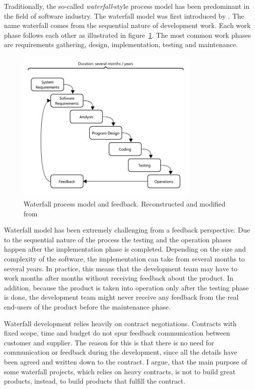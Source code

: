 \documentclass[english,12pt,a4paper,pdftex]{article}
\begin{document}
Traditionally, the so-called \emph{waterfall}-style process model has been predominant in the field of software industry. The waterfall model was first introduced by \citet{royce1970}. The name waterfall comes from the sequential nature of development work. Each work phase follows each other as illustrated in figure~\ref{fig:waterfall}. The most common work phases are requirements gathering, design, implementation, testing and maintenance.


\begin{figure}[htb]
\begin{center}
\includegraphics[width=0.8\textwidth]{waterfall_reconstructed.png}
\end{center}
\caption{Waterfall process model and feedback. Reconstructed and modified from \citet{royce1970}}
\label{fig:waterfall}
\end{figure}


Waterfall model has been extremely challenging from a feedback perspective. Due to the sequential nature of the process the testing and the operation phases happen after the implementation phase is completed. Depending on the size and complexity of the software, the implementation can take from several months to several years. In practice, this means that the development team may have to work months after months without receiving feedback about the product. In addition, because the product is taken into operation only after the testing phase is done, the development team might never receive any feedback from the real end-users of the product before the maintenance phase.

Waterfall development relies heavily on contract negotiations. Contracts with fixed scope, time and budget do not spur feedback communication between customer and supplier. The reason for this is that there is no need for communication or feedback during the development, since all the details have been agreed and written down to the contract. I argue, that the main purpose of some waterfall projects, which relies on heavy contracts, is not to build great products, instead, to build products that fulfill the contract.
\end{document}
